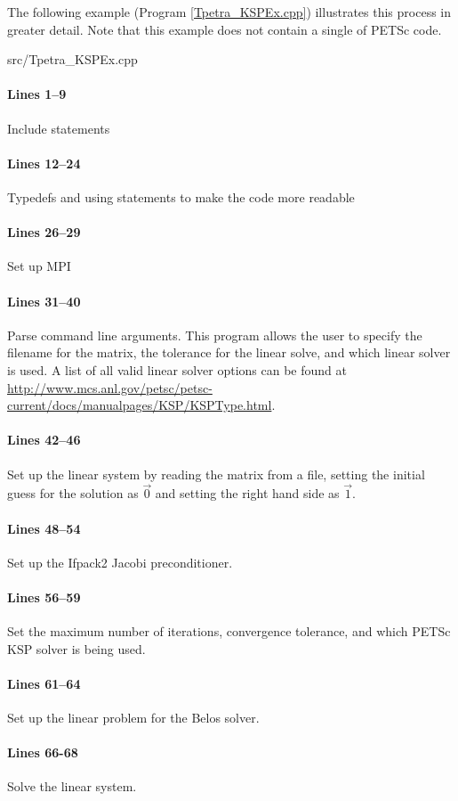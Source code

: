 The following example (Program \ref{Tpetra_KSPEx.cpp}) illustrates this process
in greater detail.  Note that this example does not contain a single of PETSc
code.

\begin{lstinputlisting}[caption=Tpetra\_KSPEx.cpp,label=Tpetra_KSPEx.cpp]{src/Tpetra_KSPEx.cpp}
\end{lstinputlisting}

\paragraph{Lines 1--9}
Include statements

\paragraph{Lines 12--24}
Typedefs and using statements to make the code more readable

\paragraph{Lines 26--29}
Set up MPI

\paragraph{Lines 31--40}
Parse command line arguments.  This program allows the user to specify the
filename for the matrix, the tolerance for the linear solve, and which linear
solver is used.  A list of all valid linear solver options can be found at
\url{http://www.mcs.anl.gov/petsc/petsc-current/docs/manualpages/KSP/KSPType.html}.

\paragraph{Lines 42--46}
Set up the linear system by reading the matrix from a file, setting the initial
guess for the solution as $\vec{0}$ and setting the right hand side as
$\vec{1}$.

\paragraph{Lines 48--54}
Set up the Ifpack2 Jacobi preconditioner.

\paragraph{Lines 56--59}
Set the maximum number of iterations, convergence tolerance, and which PETSc
KSP solver is being used.

\paragraph{Lines 61--64}
Set up the linear problem for the Belos solver.

\paragraph{Lines 66-68}
Solve the linear system.